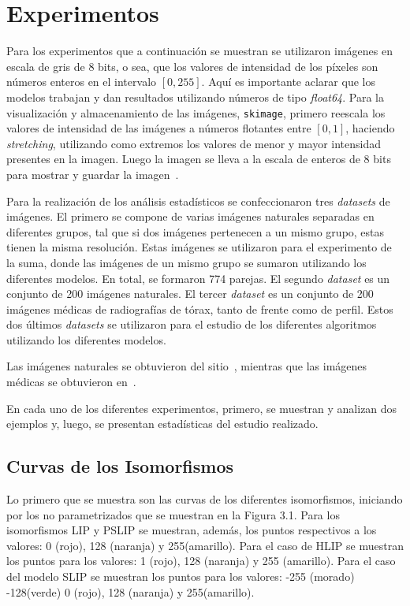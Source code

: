 \section{Experimentos}
Para los experimentos que a continuaci\'on se muestran se utilizaron im\'agenes en escala de gris de 8 bits, o sea, que los valores de intensidad de los p\'ixeles son n\'umeros enteros en el intervalo $[0,255]$. Aqu\'i es importante aclarar que los modelos trabajan y dan resultados utilizando n\'umeros de tipo \textit{float64}. Para la visualizaci\'on y almacenamiento de las im\'agenes, \verb|skimage|, primero reescala los valores de intensidad de las im\'agenes a n\'umeros flotantes entre $[0,1]$, haciendo \textit{stretching}, utilizando como extremos los valores de menor y mayor intensidad presentes en la imagen. Luego la imagen se lleva a la escala de enteros de 8 bits para mostrar y guardar la imagen~\cite{image_data_types_and_what_they_mean}.

Para la realizaci\'on de los an\'alisis estad\'isticos se confeccionaron tres \textit{datasets} de im\'agenes. El primero se compone de varias im\'agenes naturales separadas en diferentes grupos, tal que si dos im\'agenes pertenecen a un mismo grupo, estas tienen la misma resoluci\'on. Estas im\'agenes se utilizaron para el experimento de la suma, donde las im\'agenes de un mismo grupo se sumaron utilizando los diferentes modelos. En total, se formaron 774 parejas. El segundo \textit{dataset} es un conjunto de 200 im\'agenes naturales. El tercer \textit{dataset} es un conjunto de 200 im\'agenes m\'edicas de radiograf\'ias de t\'orax, tanto de frente como de perfil. Estos dos \'ultimos \textit{datasets} se utilizaron para el estudio de los diferentes algoritmos utilizando los diferentes modelos.

Las im\'agenes naturales se obtuvieron del sitio~\cite{coco}, mientras que las im\'agenes m\'edicas se obtuvieron en~\cite{chestxrays}.

En cada uno de los diferentes experimentos, primero, se muestran y analizan dos ejemplos y, luego, se presentan estad\'isticas del estudio realizado.

\subsection{Curvas de los Isomorfismos}
Lo primero que se muestra son las curvas de los diferentes isomorfismos, iniciando por los no parametrizados que se muestran en la Figura 3.1. Para los isomorfismos LIP y PSLIP se muestran, adem\'as, los puntos respectivos a los valores: 0 (rojo), 128 (naranja) y 255(amarillo). Para el caso de HLIP se muestran los puntos para los valores: 1 (rojo), 128 (naranja) y 255 (amarillo). Para el caso del modelo SLIP se muestran los puntos para los valores: -255 (morado) -128(verde) 0 (rojo), 128 (naranja) y 255(amarillo).

